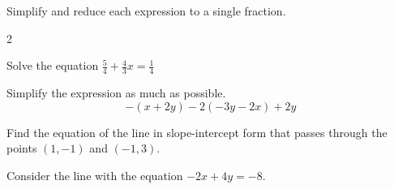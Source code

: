 \documentclass[11pt]{exam}
\begin{document}
\begin{questions}
\question[15] Simplify and reduce each expression to a single fraction.
\begin{multicols}{2}
\addpoints
\end{multicols}
\vspace{3.5in}
\question[15] Solve the equation $\displaystyle \frac{5}{4}+\frac{4}{3}x = \frac{1}{4}$
\vspace{4in}
\addpoints

\question[10] Simplify the expression as much as possible.
\[
- (x+2y) - 2(-3y-2x) + 2y
\]
\vspace{3.5in}

\question[15] Find the equation of the line in slope-intercept form that passes through the points $(1,-1)$ and $(-1,3)$.
\vspace{3.5in}

\newpage
\question[20] Consider the line with the equation $-2x + 4y = -8.$
\noaddpoints
{}
\end{questions}
\end{document}
